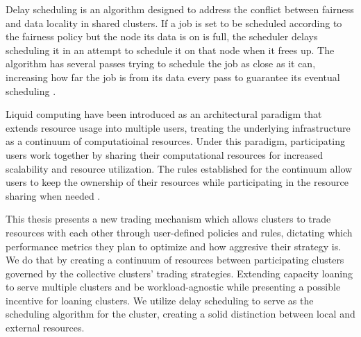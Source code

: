 Delay scheduling is an algorithm designed to address the conflict between
fairness and data locality in shared clusters. If a job is set to be scheduled
according to the fairness policy but the node its data is on is full, the
scheduler delays scheduling it in an attempt to schedule it on that node when
it frees up. The algorithm has several passes trying to schedule the job as
close as it can, increasing how far the job is from its data every pass to
guarantee its eventual scheduling \cite{zaharia_delay_2010}.

Liquid computing have been introduced as an architectural paradigm that extends
resource usage into multiple users, treating the underlying infrastructure as a
continuum of computatioinal resources. Under this paradigm, participating users
work together by sharing their computational resources for increased
scalability and resource utilization. The rules established for the continuum
allow users to keep the ownership of their resources while participating in the
resource sharing when needed \cite{iorio_computing_2023, noauthor_liqo_nodate}.

This thesis presents a new trading mechanism which allows clusters to trade
resources with each other through user-defined policies and rules, dictating
which performance metrics they plan to optimize and how aggresive their
strategy is. We do that by creating a continuum of resources between
participating clusters governed by the collective clusters' trading strategies.
Extending capacity loaning to serve multiple clusters and be workload-agnostic
while presenting a possible incentive for loaning clusters. We utilize delay
scheduling to serve as the scheduling algorithm for the cluster, creating a
solid distinction between local and external resources.

